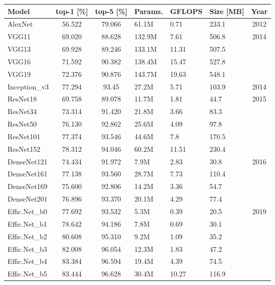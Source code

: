 \begin{table}[ht]
    \centering
    \begin{tabular}{l|c|c|l|l|l|c}
        \hline
        \textbf{Model} & \textbf{top-1 [\%]} & \textbf{top-5 [\%]} & 
        \textbf{Params.} & \textbf{GFLOPS} & \textbf{Size [MB]} & 
        \textbf{Year} \\
        \hline
        \hline
        AlexNet & 56.522 & 79.066 & 61.1M & 0.71 & 233.1 & 2012 \\
        \hline
        VGG11 & 69.020 & 88.628 & 132.9M & 7.61 & 506.8 & 2014 \\
        VGG13 & 69.928 & 89.246 & 133.1M & 11.31 & 507.5 & \\
        VGG16 & 71.592 & 90.382 & 138.4M & 15.47 & 527.8 & \\
        VGG19 & 72.376 & 90.876 & 143.7M & 19.63 & 548.1 & \\
        \hline
        Inception\_v3 & 77.294 & 93.45 & 27.2M & 5.71 & 103.9 & 2014 \\
        \hline
        ResNet18 & 69.758 & 89.078 & 11.7M & 1.81 & 44.7 & 2015 \\
        ResNet34 & 73.314 & 91.420 & 21.8M & 3.66 & 83.3 & \\
        ResNet50 & 76.130 & 92.862 & 25.6M & 4.09 & 97.8 & \\
        ResNet101 & 77.374 & 93.546 & 44.6M & 7.8 & 170.5 & \\
        ResNet152 & 78.312 & 94.046 & 60.2M & 11.51 & 230.4 & \\
        \hline
        DenseNet121 & 74.434 & 91.972 & 7.9M & 2.83 & 30.8 & 2016 \\
        DenseNet161 & 77.138 & 93.560 & 28.7M & 7.73 & 110.4 & \\
        DenseNet169 & 75.600 & 92.806 & 14.2M & 3.36 & 54.7 & \\
        DenseNet201 & 76.896 & 93.370 & 20.1M & 4.29 & 77.4 & \\
        \hline
        Effic.Net\_b0 & 77.692 & 93.532 & 5.3M & 0.39 & 20.5 & 2019 \\
        Effic.Net\_b1 & 78.642 & 94.186 & 7.8M & 0.69 & 30.1 & \\
        Effic.Net\_b2 & 80.608 & 95.310 & 9.2M & 1.09 & 35.2 & \\
        Effic.Net\_b3 & 82.008 & 96.054 & 12.3M & 1.83 & 47.2 & \\
        Effic.Net\_b4 & 83.384 & 96.594 & 19.4M & 4.39 & 74.5 & \\
        Effic.Net\_b5 & 83.444 & 96.628 & 30.4M & 10.27 & 116.9 & \\

\end{tabular}
\end{table}
